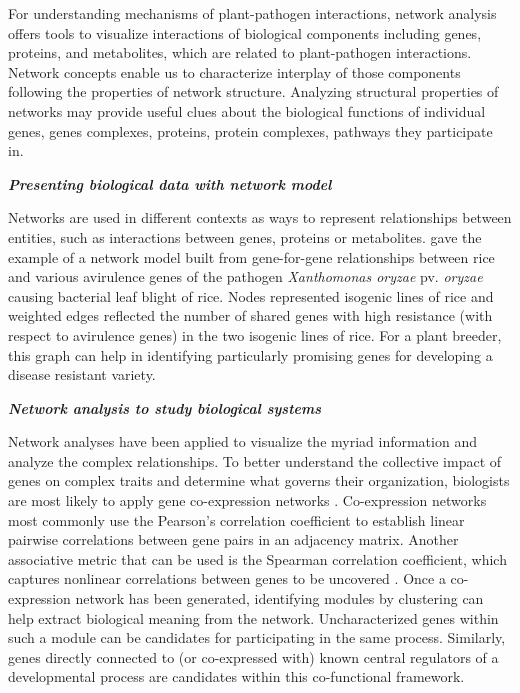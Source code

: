 For understanding mechanisms of plant-pathogen interactions, network analysis offers tools to visualize interactions of biological components including genes, proteins, and metabolites, which are related to plant-pathogen interactions. Network concepts enable us to characterize interplay of those components following the properties of network structure. Analyzing structural properties of networks may provide useful clues about the biological functions of individual genes, genes complexes, proteins, protein complexes, pathways they participate in.

\textit{\textbf{Presenting biological data with network model}}

Networks are used in different contexts as ways to represent relationships between entities, such as interactions between genes, proteins or metabolites. \citet{wu2007gene} gave the example of a network model built from gene-for-gene relationships between rice and various avirulence genes of the pathogen \textit{Xanthomonas oryzae} pv. \textit{oryzae} causing bacterial leaf blight of rice. Nodes represented isogenic lines of rice and weighted edges reflected the number of shared genes with high resistance (with respect to avirulence genes) in the two isogenic lines of rice. For a plant breeder, this graph can help in identifying particularly promising genes for developing a disease resistant variety.


\textit{\textbf{Network analysis to study biological systems}}

Network analyses have been applied to visualize the myriad information and analyze the complex relationships. To better understand the collective impact of genes on complex traits and determine what governs their organization, biologists are most likely to apply gene co-expression networks \citep{usadel2009co}. Co-expression networks most commonly use the Pearson's correlation coefficient to establish linear pairwise correlations between gene pairs in an adjacency matrix. Another associative metric that can be used is the Spearman correlation coefficient, which captures nonlinear correlations between genes to be uncovered \citep{usadel2009co, horvath2011weighted}. Once a co-expression network has been generated, identifying modules by clustering can help extract biological meaning from the network. Uncharacterized genes within such a module can be candidates for participating in the same process. Similarly, genes directly connected to (or co-expressed with) known central regulators of a developmental process are candidates within this co-functional framework.


